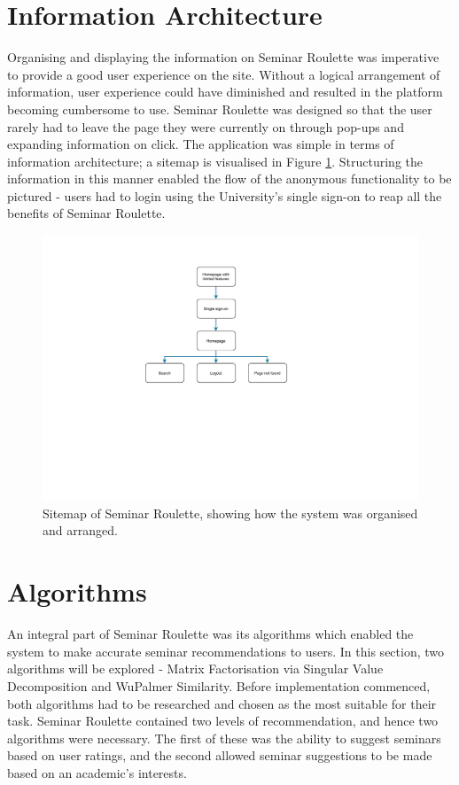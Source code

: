 \documentclass{l4proj}
\begin{document}
\section{Information Architecture}

Organising and displaying the information on Seminar Roulette was imperative to provide a good user experience on the site. Without a logical arrangement of information, user experience could have diminished and resulted in the platform becoming cumbersome to use. Seminar Roulette was designed so that the user rarely had to leave the page they were currently on through pop-ups and expanding information on click. The application was simple in terms of information architecture; a sitemap is visualised in Figure \ref{fig:site_flow}. Structuring the information in this manner enabled the flow of the anonymous functionality to be pictured - users had to login using the University's single sign-on to reap all the benefits of Seminar Roulette.

\begin{figure}[htb]
    \centering
    \includegraphics[width=0.54\linewidth]{images/site_flow.pdf}    
    \caption{Sitemap of Seminar Roulette, showing how the system was organised and arranged.}
    \label{fig:site_flow} 
\end{figure}

\section{Algorithms}
\label{section:algorithms}

An integral part of Seminar Roulette was its algorithms which enabled the system to make accurate seminar recommendations to users. In this section, two algorithms will be explored - Matrix Factorisation via Singular Value Decomposition and WuPalmer Similarity. Before implementation commenced, both algorithms had to be researched and chosen as the most suitable for their task. Seminar Roulette contained two levels of recommendation, and hence two algorithms were necessary. The first of these was the ability to suggest seminars based on user ratings, and the second allowed seminar suggestions to be made based on an academic's interests.
\end{document}

